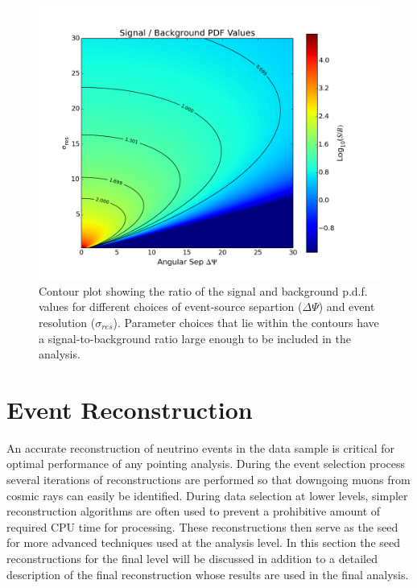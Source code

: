 \documentclass{gatech-thesis}
\begin{document}
\begin{figure}[ht]
  \begin{center}
    \includegraphics[width=.65\textwidth,keepaspectratio]{SignalOverBackground_ContourMap.png}
  \end{center}
  \caption{Contour plot showing the ratio of the signal and background p.d.f. values for different choices of event-source separtion ($\Delta \Psi$) and event resolution ($\sigma_{res}$). Parameter choices that lie within the contours have a signal-to-background ratio large enough to be included in the analysis.}
  \label{fig:QualityCutParameterSpace}
\end{figure}

\section{Event Reconstruction}
An accurate reconstruction of neutrino events in the data sample is critical for optimal performance of any pointing analysis. During the event selection process several iterations of reconstructions are performed so that downgoing muons from cosmic rays can easily be identified. During data selection at lower levels, simpler reconstruction algorithms are often used to prevent a prohibitive amount of required CPU time for processing. These reconstructions then serve as the seed for more advanced techniques used at the analysis level. In this section the seed reconstructions for the final level will be discussed in addition to a detailed description of the final reconstruction whose results are used in the final analysis.
\end{document}

